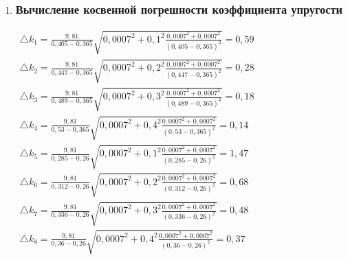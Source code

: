 \begin{enumerate}
		\item \subsubsection*{Вычисление косвенной погрешности коэффициента упругости}
		\label{appendix: 5}
		\(\begin{aligned}\triangle k_1 = \frac{9,81}{0,405 - 0,365} \sqrt{0,0007^2 + 0,1^2 \frac{0,0007^2 + 0,0007^2}{(0,405 - 0,365)^2}} = 0,59\end{aligned}\) \\
		\(\begin{aligned}\triangle k_2 = \frac{9,81}{0,447 - 0,365} \sqrt{0,0007^2 + 0,2^2 \frac{0,0007^2 + 0,0007^2}{(0,447 - 0,365)^2}} = 0,28\end{aligned}\) \\
		\(\begin{aligned}\triangle k_3 = \frac{9,81}{0,489 - 0,365} \sqrt{0,0007^2 + 0,3^2 \frac{0,0007^2 + 0,0007^2}{(0,489 - 0,365)^2}} = 0,18\end{aligned}\) \\
		\(\begin{aligned}\triangle k_4 = \frac{9,81}{0,53 - 0,365} \sqrt{0,0007^2 + 0,4^2 \frac{0,0007^2 + 0,0007^2}{(0,53 - 0,365)^2}} = 0,14\end{aligned}\) \\
		\(\begin{aligned}\triangle k_5 = \frac{9,81}{0,285 - 0,26} \sqrt{0,0007^2 + 0,1^2 \frac{0,0007^2 + 0,0007^2}{(0,285 - 0,26)^2}} = 1,47\end{aligned}\) \\
		\(\begin{aligned}\triangle k_6 = \frac{9,81}{0,312 - 0,26} \sqrt{0,0007^2 + 0,2^2 \frac{0,0007^2 + 0,0007^2}{(0,312 - 0,26)^2}} = 0,68\end{aligned}\) \\
		\(\begin{aligned}\triangle k_7 = \frac{9,81}{0,336 - 0,26} \sqrt{0,0007^2 + 0,3^2 \frac{0,0007^2 + 0,0007^2}{(0,336 - 0,26)^2}} = 0,48\end{aligned}\) \\
		\(\begin{aligned}\triangle k_8 = \frac{9,81}{0,36 - 0,26} \sqrt{0,0007^2 + 0,4^2 \frac{0,0007^2 + 0,0007^2}{(0,36 - 0,26)^2}} = 0,37\end{aligned}\) \\
		

\end{enumerate}

